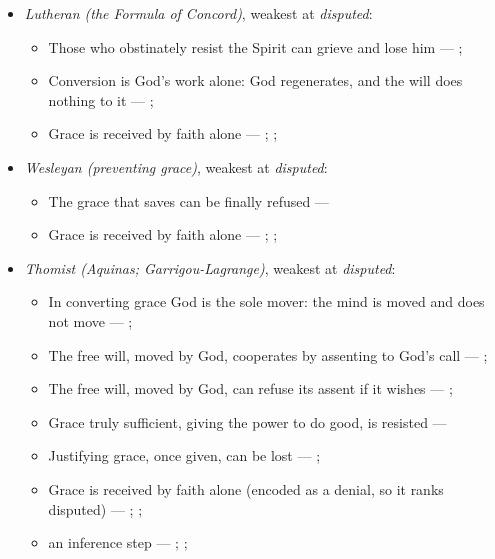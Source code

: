 \documentclass[11pt]{article}
\begin{document}
\begin{itemize}
\begin{itemize}
\end{itemize}
\item \emph{Lutheran (the Formula of Concord)}, weakest at \emph{disputed}:
\begin{itemize}
\item Those who obstinately resist the Spirit can grieve and lose him --- \cite[Solid Declaration II.83]{concordia-triglotta-1921}; \cite[Solid Declaration XI.42]{concordia-triglotta-1921}
\item Conversion is God’s work alone: God regenerates, and the will does nothing to it --- \cite[Solid Declaration II.89]{concordia-triglotta-1921}; \cite[Solid Declaration II.90]{concordia-triglotta-1921}
\item Grace is received by faith alone --- \cite[Augsburg Confession IV.1–3]{concordia-triglotta-1921}; \cite[Sermon 1, III.1]{wesley-sermons-1872}; \cite[Trent, Session VI (1547), canon 9]{tanner-decrees-1990}
\end{itemize}
\item \emph{Wesleyan (preventing grace)}, weakest at \emph{disputed}:
\begin{itemize}
\item The grace that saves can be finally refused --- \cite[397]{wesley-works-9-1827}
\item Grace is received by faith alone --- \cite[Augsburg Confession IV.1–3]{concordia-triglotta-1921}; \cite[Sermon 1, III.1]{wesley-sermons-1872}; \cite[Trent, Session VI (1547), canon 9]{tanner-decrees-1990}
\end{itemize}
\item \emph{Thomist (Aquinas; Garrigou-Lagrange)}, weakest at \emph{disputed}:
\begin{itemize}
\item In converting grace God is the sole mover: the mind is moved and does not move --- \cite[I-II q.111 a.2]{aquinas-summa-1920}; \cite[ch. IV]{garrigou-lagrange-grace-1952}
\item The free will, moved by God, cooperates by assenting to God’s call --- \cite[Trent, Session VI (1547), canon 4]{tanner-decrees-1990}; \cite[45]{waterworth-trent-1848}
\item The free will, moved by God, can refuse its assent if it wishes --- \cite[Trent, Session VI (1547), canon 4]{tanner-decrees-1990}; \cite[45]{waterworth-trent-1848}
\item Grace truly sufficient, giving the power to do good, is resisted --- \cite[ch. VI]{garrigou-lagrange-grace-1952}
\item Justifying grace, once given, can be lost --- \cite[II-II q.24 a.11]{aquinas-summa-1920}; \cite[Trent, Session VI (1547), canon 23]{tanner-decrees-1990}
\item Grace is received by faith alone (encoded as a denial, so it ranks disputed) --- \cite[II-II q.4 a.3]{aquinas-summa-1920}; \cite[I-II q.113 a.4 ad 1]{aquinas-summa-1920}; \cite[Trent, Session VI (1547), canon 9]{tanner-decrees-1990}
\item an inference step --- \cite{pohle-molinism-1911}; \cite[I-II q.112 a.3]{aquinas-summa-1920}; \cite[ch. VII]{garrigou-lagrange-grace-1952}
\end{itemize}
\end{itemize}
\end{document}
